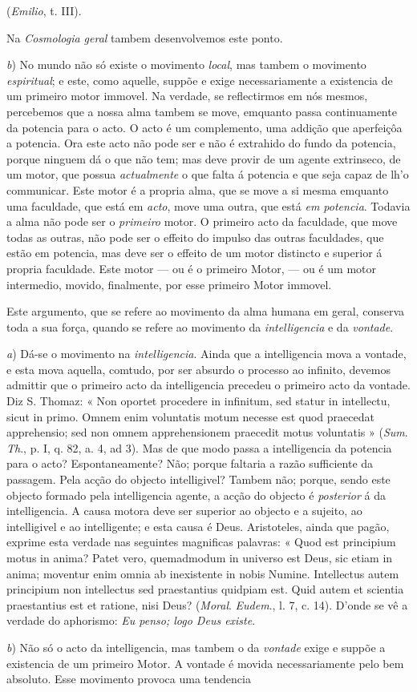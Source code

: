 (\emph{Emilio}, t. III).\par Na \emph{Cosmologia geral} tambem desenvolvemos este ponto.\par \emph{b}) No mundo não só existe o movimento \emph{local}, mas tambem o movimento \emph{espiritual}; e este, como aquelle, suppõe e exige necessariamente a existencia de um primeiro motor immovel. Na verdade, se reflectirmos em nós mesmos, percebemos que a nossa alma tambem se move, emquanto passa continuamente da potencia para o acto. O acto é um complemento, uma addição que aperfeiçôa a potencia. Ora este acto não pode ser e não é extrahido do fundo da potencia, porque ninguem dá o que não tem; mas deve provir de um agente extrinseco, de um motor, que possua \emph{actualmente} o que falta á potencia e que seja capaz de lh'o communicar. Este motor é a propria alma, que se move a si mesma emquanto uma faculdade, que está em \emph{acto}, move uma outra, que está \emph{em potencia}. Todavia a alma não pode ser o \emph{primeiro} motor. O primeiro acto da faculdade, que move todas as outras, não pode ser o effeito do impulso das outras faculdades, que estão em potencia, mas deve ser o effeito de um motor distincto e superior á propria faculdade. Este motor --- ou é o primeiro Motor, --- ou é um motor intermedio, movido, finalmente, por esse primeiro Motor immovel.\par Este argumento, que se refere ao movimento da alma humana em geral, conserva toda a sua força, quando se refere ao movimento da \emph{intelligencia} e da \emph{vontade}.\par \emph{a}) Dá-se o movimento na \emph{intelligencia}. Ainda que a intelligencia mova a vontade, e esta mova aquella, comtudo, por ser absurdo o processo ao infinito, devemos admittir que o primeiro acto da intelligencia precedeu o primeiro acto da vontade. Diz S. Thomaz: « Non oportet procedere in infinitum, sed statur in intellectu, sicut in primo. Omnem enim voluntatis motum necesse est quod praecedat apprehensio; sed non omnem apprehensionem praecedit motus voluntatis » (\emph{Sum}. \emph{Th}., p. I, q. 82, a. 4, ad 3). Mas de que modo passa a intelligencia da potencia para o acto? Espontaneamente? Não; porque faltaria a razão sufficiente da passagem. Pela acção do objecto intelligivel? Tambem não; porque, sendo este objecto formado pela intelligencia agente, a acção do objecto é \emph{posterior} á da intelligencia. A causa motora deve ser superior ao objecto e a sujeito, ao intelligivel e ao intelligente; e esta causa é Deus. Aristoteles, ainda que pagão, exprime esta verdade nas seguintes magnificas palavras: « Quod est principium motus in anima? Patet vero, quemadmodum in universo est Deus, sic etiam in anima; moventur enim omnia ab inexistente in nobis Numine. Intellectus autem principium non intellectus sed praestantius quidpiam est. Quid autem et scientia praestantius est et ratione, nisi Deus? (\emph{Moral}. \emph{Eudem}., l. 7, c. 14). D'onde se vê a verdade do aphorismo: \emph{Eu penso; logo Deus existe}.\par \emph{b}) Não só o acto da intelligencia, mas tambem o da \emph{vontade} exige e suppõe a existencia de um primeiro Motor. A vontade é movida necessariamente pelo bem absoluto. Esse movimento provoca uma tendencia 